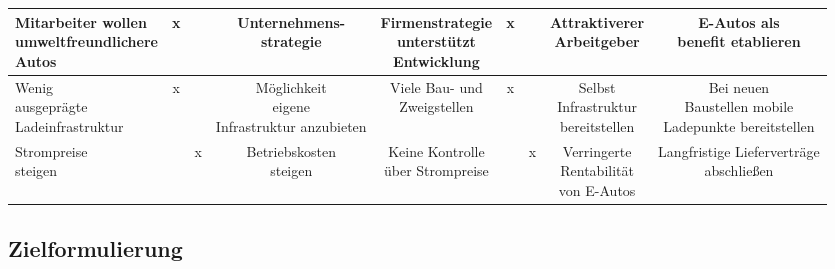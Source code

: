 \documentclass{article}
\begin{document}
\begin{landscape}
\begin{tabular}{| l | c | c | c | c | c | c | c | c |}
		\makecell{Mitarbeiter wollen \\ umweltfreundlichere \\ Autos} & \cellcolor{green!25}x & & \makecell{Unternehmens-\\strategie} & \makecell{Firmenstrategie \\ unterstützt \\ Entwicklung} & \cellcolor{green!25}x & & \makecell{Attraktiverer \\ Arbeitgeber} & \makecell{E-Autos als \\ benefit etablieren} \\ \hline

		\makecell{Wenig \\ ausgeprägte \\ Ladeinfrastruktur} & \cellcolor{green!25}x & & \makecell{Möglichkeit \\ eigene \\ Infrastruktur anzubieten} & \makecell{Viele Bau- und \\ Zweigstellen} & \cellcolor{green!25}x & & \makecell{Selbst \\ Infrastruktur \\ bereitstellen} & \makecell{Bei neuen \\ Baustellen mobile \\ Ladepunkte bereitstellen} \\ \hline
		\makecell{Strompreise \\ steigen} & & \cellcolor{red!25}x & \makecell{Betriebskosten \\ steigen} & \makecell{Keine Kontrolle \\ über Strompreise} &  &\cellcolor{red!25}x & \makecell{Verringerte \\ Rentabilität \\ von E-Autos} & \makecell{Langfristige Lieferverträge \\ abschließen} \\ 
		\bottomrule
	\end{tabular}
	\end{landscape}
	\subsection{Zielformulierung}
\end{document}
